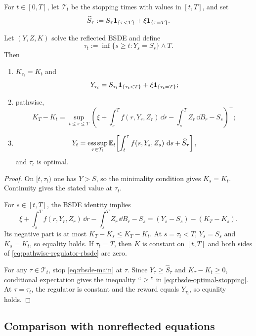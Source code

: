 For $t\in[0,T]$, let $\mathcal T_t$ be the stopping times with values in
$[t,T]$, and set
\[
  \widehat S_\tau
  :=S_\tau\mathbf 1_{\{\tau<T\}}+\xi\mathbf 1_{\{\tau=T\}}.
\]

\begin{theorem}
Let $(Y,Z,K)$ solve the reflected BSDE and define
\[
  \tau_t:=\inf\{s\geq t:Y_s=S_s\}\wedge T.
\]
Then
\begin{enumerate}[label=(\roman*)]
  \item $K_{\tau_t}=K_t$ and
  \[
    Y_{\tau_t}=S_{\tau_t}\mathbf 1_{\{\tau_t<T\}}
                  +\xi\mathbf 1_{\{\tau_t=T\}};
  \]
  \item pathwise,
  \begin{equation}
    K_T-K_t
    =\sup_{t\leq s\leq T}
      \left(
        \xi+\int_s^T f(r,Y_r,Z_r)\,\dd r
        -\int_s^T Z_r\,\dd B_r-S_s
      \right)^-; \label{eq:pathwise-regulator-rbsde}
  \end{equation}
  \item
  \begin{equation}
    Y_t
    =\operatorname*{ess\,sup}_{\tau\in\mathcal T_t}
       \mathbb E_t\!\left[
         \int_t^\tau f(s,Y_s,Z_s)\,\mathop{}\!\mathrm d s+\widehat S_\tau
       \right], \label{eq:rbsde-optimal-stopping}
  \end{equation}
  and $\tau_t$ is optimal.
\end{enumerate}
\end{theorem}

\begin{proof}
On $[t,\tau_t)$ one has $Y>S$, so the minimality condition gives
$K_s=K_t$. Continuity gives the stated value at $\tau_t$.

For $s\in[t,T]$, the BSDE identity implies
\[
  \xi+\int_s^T f(r,Y_r,Z_r)\,\dd r
  -\int_s^T Z_r\,\dd B_r-S_s
  =(Y_s-S_s)-(K_T-K_s).
\]
Its negative part is at most $K_T-K_s\leq K_T-K_t$. At $s=\tau_t<T$,
$Y_s=S_s$ and $K_s=K_t$, so equality holds. If $\tau_t=T$, then $K$ is
constant on $[t,T]$ and both sides of \eqref{eq:pathwise-regulator-rbsde}
are zero.

For any $\tau\in\mathcal T_t$, stop \eqref{eq:rbsde-main} at $\tau$.
Since $Y_\tau\geq\widehat S_\tau$ and $K_\tau-K_t\geq0$, conditional
expectation gives the inequality ``$\geq$'' in
\eqref{eq:rbsde-optimal-stopping}. At $\tau=\tau_t$, the regulator is
constant and the reward equals $Y_{\tau_t}$, so equality holds.
\end{proof}

\subsection{Comparison with nonreflected equations}

